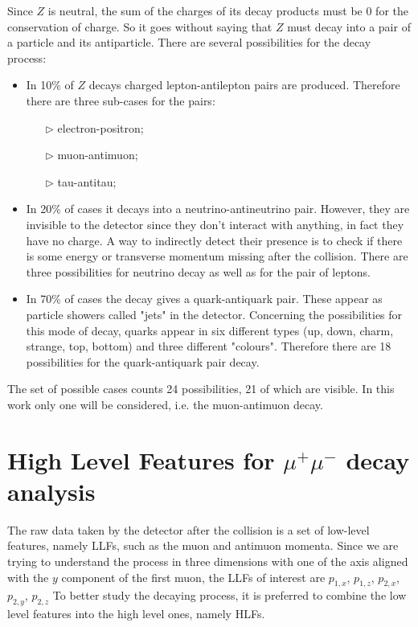 Since $Z$ is neutral, the sum of the charges of its decay products must be 0 for the conservation of charge. So it goes without saying that $Z$ must decay into a pair of a particle and its antiparticle. There are several possibilities for the decay process\footnotemark:
\begin{itemize}
	\item In 10\% of $Z$ decays charged lepton-antilepton pairs are produced. Therefore there are three sub-cases for the pairs:
	\begin{itemize}
		\item[$\triangleright$] electron-positron;
		\item[$\triangleright$] muon-antimuon;
		\item[$\triangleright$] tau-antitau;
	\end{itemize}
	
	\item In 20\% of cases it decays into a neutrino-antineutrino pair. However, they are invisible to the detector since they don't interact with anything, in fact they have no charge. A way to indirectly detect their presence is to check if there is some energy or transverse momentum missing after the collision. There are three possibilities for neutrino decay as well as for the pair of leptons.
	
	\item In 70\% of cases the decay gives a quark-antiquark pair. These appear as particle showers called "jets" in the detector. Concerning the possibilities for this mode of decay, quarks appear in six different types (up, down, charm, strange, top, bottom) and three different "colours". Therefore there are 18 possibilities for the quark-antiquark pair decay.
\end{itemize}


The set of possible cases counts 24 possibilities, 21 of which are visible. In this work only one will be considered, i.e. the muon-antimuon decay.





\section{High Level Features for $\mu^{+}\mu^{-}$ decay analysis}
The raw data taken by the detector after the collision is a set of low-level features, namely LLFs, such as the muon and antimuon momenta. Since we are trying to understand the process in three dimensions with one of the axis aligned with the $y$ component of the first muon, the LLFs of interest are $p_{1,x}$, $p_{1,z}$, $p_{2,x}$, $p_{2,y}$, $p_{2,z}$
To better study the decaying process, it is preferred to combine the low level features into the high level ones, namely HLFs.

